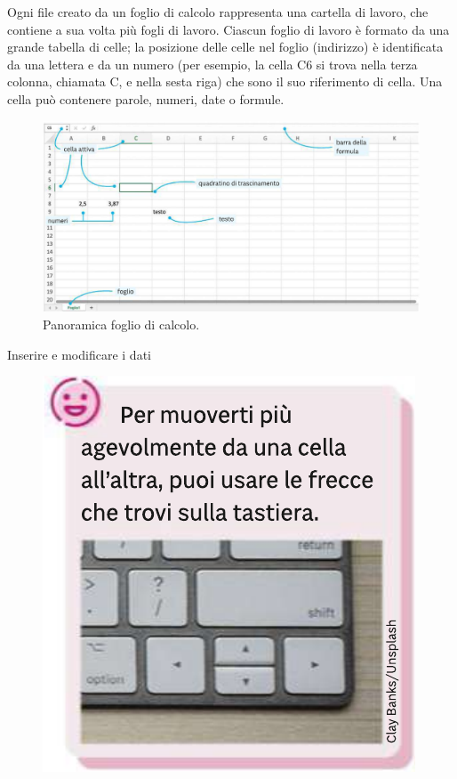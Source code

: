\documentclass[12pt,a4paper,oneside]{book}
\makeatletter
\renewcommand{\subsection}{\@startsection {subsection}{2}{\z@}
{-3ex \@plus -0.1ex \@minus -.4ex}
{0.5ex \@plus.2ex }
{\color[rgb]{0.141,0.596,0.749}\normalfont\sffamily\bfseries}}
\theoremstyle{esercizio}
\makeatother
\begin{document}
    Ogni file creato da un foglio di calcolo rappresenta una cartella di lavoro, che contiene a sua volta più fogli di lavoro. Ciascun foglio di lavoro è formato da una grande tabella di celle; la posizione delle celle nel foglio (indirizzo) è identificata da una lettera e da un numero (per esempio, la cella C6 si trova nella terza colonna, chiamata C, e nella sesta riga) che sono il suo riferimento di cella.
    Una cella può contenere parole, numeri, date o formule.
    \begin{figure}[h!]
        \centering
        \includegraphics[width=\linewidth]{img/calc.png} 
        \caption{Panoramica foglio di calcolo.}
        \label{fig:librecalc}
    \end{figure} 

\subsection{Inserire e modificare i dati}
\begin{figure}[h!]
    \centering
    \includegraphics[scale=0.3]{img/tasti.png} 
    \label{fig:tasti}
\end{figure} 
\end{document}
